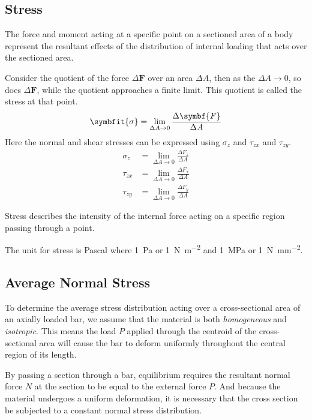 \documentclass{article}
\begin{document}
\subsection{Stress}
The force and moment acting at a specific point on a sectioned area of a body represent the resultant effects of
the distribution of internal loading that acts over the sectioned area.
\begin{definition}[Stress]
    Consider the quotient of the force \(\Delta \symbf{F}\) over an area \(\Delta A\), then as the \(\Delta A \to 0\),
    so does \(\Delta \symbf{F}\), while the quotient approaches a finite limit. This quotient is called the stress at
    that point.
    \begin{equation*}
        \symbfit{\sigma} = \lim_{\Delta A \to 0} \frac{\Delta \symbf{F}}{\Delta A}
    \end{equation*}
    Here the normal and shear stresses can be expressed using \(\sigma_z\) and \(\tau_{zx}\) and \(\tau_{zy}\).
    \begin{align*}
        \sigma_z  & = \lim_{\Delta A \to 0} \frac{\Delta F_z}{\Delta A} \\
        \tau_{zx} & = \lim_{\Delta A \to 0} \frac{\Delta F_x}{\Delta A} \\
        \tau_{zy} & = \lim_{\Delta A \to 0} \frac{\Delta F_y}{\Delta A}
    \end{align*}

    Stress describes the intensity of the internal force acting on a specific region passing through a point.

    The unit for stress is Pascal where \qty{1}{Pa} or \qty{1}{N.m^{-2}} and \qty{1}{MPa} or \qty{1}{N.mm^{-2}}.
\end{definition}
\subsection{Average Normal Stress}
To determine the average stress distribution acting over a cross-sectional area of an axially loaded bar,
we assume that the material is both \textit{homogeneous} and \textit{isotropic}.
This means the load \(P\) applied through the centroid of the cross-sectional area
will cause the bar to deform uniformly throughout the central region of its length.

By passing a section through a bar, equilibrium requires the resultant normal force \(N\) at the section to be
equal to the external force \(P\). And because the material undergoes a uniform deformation, it is necessary
that the cross section be subjected to a constant normal stress distribution.
\end{document}
